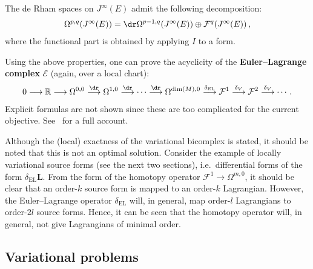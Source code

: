     \begin{result}\label{var:functional_decomposition}
        The de Rham spaces on $J^\infty(E)$ admit the following decomposition:
        \begin{gather}
            \Omega^{p,q}(J^\infty(E)) = \dr\Omega^{p-1,q}(J^\infty(E))\oplus\mathcal{F}^q(J^\infty(E))\,,
        \end{gather}
        where the functional part is obtained by applying $I$ to a form.
    \end{result}

    Using the above properties, one can prove the acyclicity of the \textbf{Euler--Lagrange complex} $\mathcal{E}$ (again, over a local chart):
    \begin{gather}
        0\longrightarrow\mathbb{R}\longrightarrow\Omega^{0,0}\overset{\dr}{\longrightarrow}\Omega^{1,0}\overset{\dr}{\longrightarrow}\cdots\overset{\dr}{\longrightarrow}\Omega^{\dim(M),0}\overset{\delta_\mathrm{EL}}{\longrightarrow}\mathcal{F}^1\overset{\delta_V}{\longrightarrow}\mathcal{F}^2\overset{\delta_V}{\longrightarrow}\cdots\,.
    \end{gather}
    Explicit formulas are not shown since these are too complicated for the current objective. See~\cite{anderson_variational_1992} for a full account.

    \begin{remark}
        Although the (local) exactness of the variational bicomplex is stated, it should be noted that this is not an optimal solution. Consider the example of locally variational source forms (see the next two sections), i.e.~differential forms of the form $\delta_{\text{EL}}\mathbf{L}$. From the form of the homotopy operator $\mathcal{F}^1\rightarrow\Omega^{m,0}$, it should be clear that an order-$k$ source form is mapped to an order-$k$ Lagrangian. However, the Euler--Lagrange operator $\delta_{\text{EL}}$ will, in general, map order-$l$ Lagrangians to order-$2l$ source forms. Hence, it can be seen that the homotopy operator will, in general, not give Lagrangians of minimal order.
    \end{remark}

\subsection{Variational problems}

